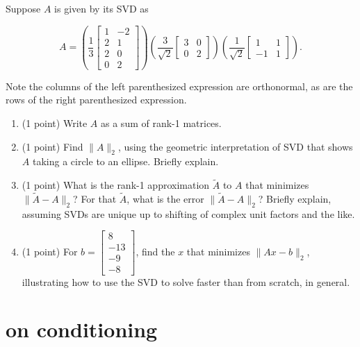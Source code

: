 \documentclass[lang=cn,11pt]{elegantbook}
\begin{document}
Suppose \( A \) is given by its SVD as

\[
A = \left( \frac{1}{3} \begin{bmatrix} 1 & -2 \\ 2 & 1 \\ 2 & 0 \\ 0 & 2 \end{bmatrix} \right) \left( \frac{3}{\sqrt{2}} \begin{bmatrix} 3 & 0 \\ 0 & 2 \end{bmatrix} \right) \left( \frac{1}{\sqrt{2}} \begin{bmatrix} 1 & 1 \\ -1 & 1 \end{bmatrix} \right).
\]

Note the columns of the left parenthesized expression are orthonormal, as are the rows of the right parenthesized expression.

\begin{enumerate}
    \item[(a)] (1 point) Write \( A \) as a sum of rank-1 matrices.
    
    \item[(b)] (1 point) Find \( \|A\|_2 \), using the geometric interpretation of SVD that shows \( A \) taking a circle to an ellipse. Briefly explain.
    
    \item[(c)] (1 point) What is the rank-1 approximation \( \tilde{A} \) to \( A \) that minimizes \( \|\tilde{A} - A\|_2 \)? For that \( \tilde{A} \), what is the error \( \|\tilde{A} - A\|_2 \)? Briefly explain, assuming SVDs are unique up to shifting of complex unit factors and the like.
    
    \item[(d)] (1 point) For \( b = \begin{bmatrix} 8 \\ -13 \\ -9 \\ -8 \end{bmatrix} \), find the \( x \) that minimizes \( \|Ax - b\|_2 \), illustrating how to use the SVD to solve faster than from scratch, in general.
\end{enumerate}






\chapter{on conditioning}
\end{document}
